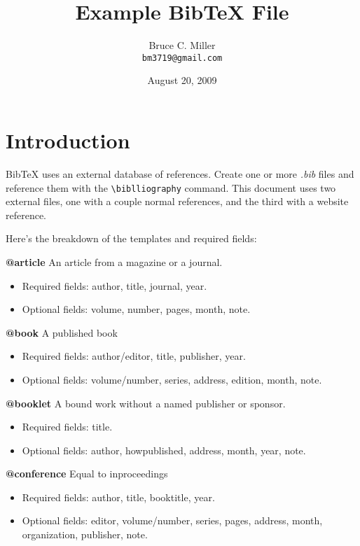 \documentclass[a4paper,12pt]{article}
\begin{document}
\title{Example BibTeX File}
\author{Bruce C. Miller \\
{\tt bm3719@gmail.com}}
\date{August 20, 2009}
\maketitle

\section{Introduction}
BibTeX uses an external database of references.  Create one or more \emph{.bib}
files and reference them with the \texttt{\textbackslash biblliography}
command.  This document uses two external files, one with a couple normal
references, and the third with a website reference.

Here's the breakdown of the templates and required fields:

\textbf{@article}
An article from a magazine or a journal.
\begin{itemize}
\item Required fields: author, title, journal, year.
\item Optional fields: volume, number, pages, month, note.
\end{itemize}

\textbf{@book}
A published book
\begin{itemize}
\item Required fields: author/editor, title, publisher, year.
\item Optional fields: volume/number, series, address, edition, month, note.
\end{itemize}

\textbf{@booklet}
A bound work without a named publisher or sponsor.
\begin{itemize}
\item Required fields: title.
\item Optional fields: author, howpublished, address, month, year, note.
\end{itemize}

\textbf{@conference}
Equal to inproceedings
\begin{itemize}
\item Required fields: author, title, booktitle, year.
\item Optional fields: editor, volume/number, series, pages, address, month,
  organization, publisher, note.
\end{itemize}
\end{document}
